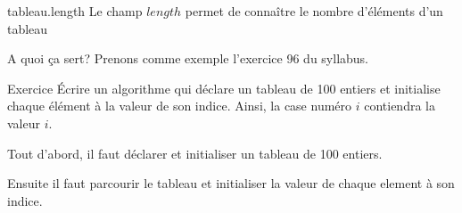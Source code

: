 \begin{frame}{tableau.length}
    Le champ $length$ permet de connaître le nombre d'éléments d'un tableau
    
\end{frame}

\begin{frame}{A quoi ça sert?}
    Prenons comme exemple l'exercice 96 du syllabus.
    \begin{block}{Exercice}
        Écrire un algorithme qui déclare un tableau de 100 entiers
        et initialise chaque élément à la valeur de son indice.
        Ainsi, la case numéro $i$ contiendra la valeur $i$.
    \end{block}
    Tout d'abord, il faut déclarer et initialiser un tableau de 100 entiers.
    
    Ensuite il faut parcourir le tableau et initialiser la valeur de chaque element à son indice.
    
\end{frame}